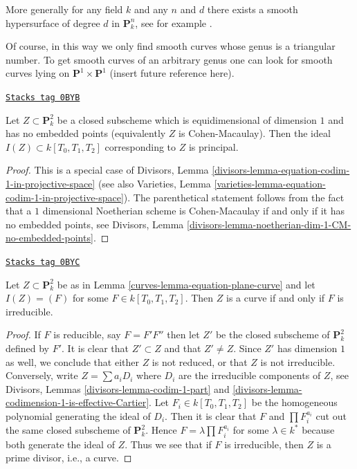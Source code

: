\medskip\noindent
More generally for any field $k$ and any $n$ and $d$ there exists
a smooth hypersurface of degree $d$ in $\mathbf{P}^n_k$, see
for example \cite{Poonen}.

\medskip\noindent
Of course, in this way we only find smooth curves whose genus
is a triangular number. To get smooth curves of an arbitrary
genus one can look for smooth curves lying on
$\mathbf{P}^1 \times \mathbf{P}^1$ (insert future reference here).

\begin{lemma}
\label{curves-lemma-equation-plane-curve}
\href{https://stacks.math.columbia.edu/tag/0BYB}{\texttt{Stacks tag 0BYB}}

Let $Z \subset \mathbf{P}^2_k$ be a closed subscheme which
is equidimensional of dimension $1$ and has no embedded points
(equivalently $Z$ is Cohen-Macaulay).
Then the ideal $I(Z) \subset k[T_0, T_1, T_2]$ corresponding
to $Z$ is principal.
\end{lemma}

\begin{proof}
This is a special case of
Divisors, Lemma \ref{divisors-lemma-equation-codim-1-in-projective-space}
(see also Varieties, Lemma
\ref{varieties-lemma-equation-codim-1-in-projective-space}).
The parenthetical statement follows from the fact that a
$1$ dimensional Noetherian scheme is Cohen-Macaulay
if and only if it has no embedded points, see
Divisors, Lemma \ref{divisors-lemma-noetherian-dim-1-CM-no-embedded-points}.
\end{proof}

\begin{lemma}
\label{curves-lemma-plane-curve}
\href{https://stacks.math.columbia.edu/tag/0BYC}{\texttt{Stacks tag 0BYC}}

Let $Z \subset \mathbf{P}^2_k$ be as in Lemma \ref{curves-lemma-equation-plane-curve}
and let $I(Z) = (F)$ for some $F \in k[T_0, T_1, T_2]$.
Then $Z$ is a curve if and only if $F$ is irreducible.
\end{lemma}

\begin{proof}
If $F$ is reducible, say $F = F' F''$ then let $Z'$ be the closed subscheme
of $\mathbf{P}^2_k$ defined by $F'$. It is clear that $Z' \subset Z$
and that $Z' \not = Z$. Since $Z'$ has dimension $1$ as well, we conclude
that either $Z$ is not reduced, or that $Z$ is not irreducible.
Conversely, write $Z = \sum a_i D_i$ where $D_i$ are the irreducible
components of $Z$, see
Divisors, Lemmas \ref{divisors-lemma-codim-1-part} and
\ref{divisors-lemma-codimension-1-is-effective-Cartier}.
Let $F_i \in k[T_0, T_1, T_2]$ be the homogeneous
polynomial generating the ideal of $D_i$. Then it is clear that
$F$ and $\prod F_i^{a_i}$ cut out the same closed subscheme of
$\mathbf{P}^2_k$. Hence $F = \lambda \prod F_i^{a_i}$ for some
$\lambda \in k^*$ because both generate the ideal of $Z$.
Thus we see that if $F$ is irreducible, then $Z$ is
a prime divisor, i.e., a curve.
\end{proof}

